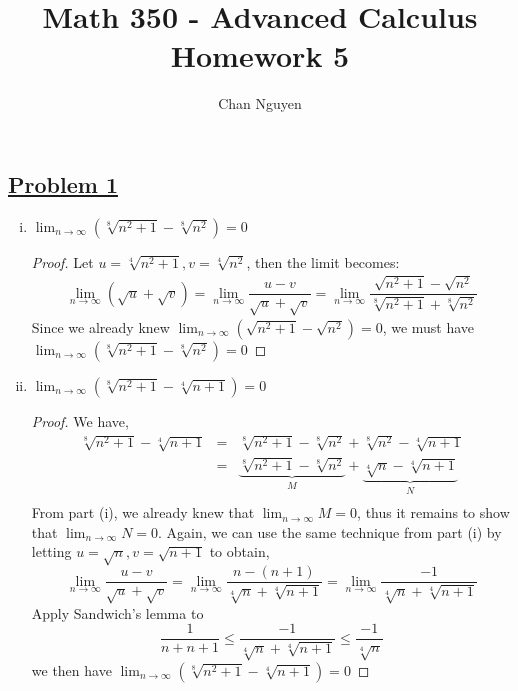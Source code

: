 \documentclass[10pt,letterpaper]{article}
\title{\textbf{Math 350 - Advanced Calculus \\ Homework 5}}
\author{Chan Nguyen}
\begin{document}
\tableofcontents 
\maketitle

\setlength{\parindent}{0pt}
\setlength{\parskip}{1ex}
	\subsection*{{\color{purple}\underline{Problem 1}}}
	\begin{enumerate}[(i)]
		\item $\displaystyle\lim_{n\to\infty}(\sqrt[8]{n^2 + 1} - \sqrt[8]{n^2}) = 0$
		\begin{proof}
		Let $u = \sqrt[4]{n^2 + 1}, v = \sqrt[4]{n^2}$, then the limit becomes:
	 	\begin{eqnarray*}
		\displaystyle\lim_{n\to\infty} (\sqrt{u} + \sqrt{v}) 
		= \displaystyle\lim_{n\to\infty} \dfrac{u - v}{\sqrt{u} + \sqrt{v}} 
		= \displaystyle\lim_{n\to\infty} \dfrac{\sqrt{n^2 + 1} - \sqrt{n^2}}{\sqrt[8]{n^2 + 1} + \sqrt[8]{n^2}} 
		\end{eqnarray*}
		Since we already knew $\displaystyle\lim_{n\to\infty} (\sqrt{n^2 + 1} - \sqrt{n^2}) = 0$, we must have 
		$\displaystyle\lim_{n\to\infty}(\sqrt[8]{n^2 + 1} - \sqrt[8]{n^2}) = 0$
		\end{proof}
		
		\item $\displaystyle\lim_{n\to\infty}(\sqrt[8]{n^2 + 1} - \sqrt[4]{n + 1}) = 0$
		\begin{proof}		
		We have,
		\begin{eqnarray*}
		\sqrt[8]{n^2 + 1} - \sqrt[4]{n + 1} 
		&=& \sqrt[8]{n^2 + 1} - \sqrt[8]{n^2} + \sqrt[8]{n^2} - \sqrt[4]{n + 1} \\
		&=& \underbrace{\sqrt[8]{n^2 + 1} - \sqrt[8]{n^2}}_M + \underbrace{\sqrt[4]{n} - \sqrt[4]{n + 1}}_N \\
		\end{eqnarray*}
		From part (i), we already knew that $\displaystyle\lim_{n\to\infty} M = 0$, thus it remains to show
		that $\displaystyle\lim_{n\to\infty}N = 0$. Again, we can use the same technique from part (i) by 
		letting $u = \sqrt{n}, v = \sqrt{n + 1}$ to obtain,
		$$\displaystyle\lim_{n\to\infty} \dfrac{u - v}{\sqrt{u} + \sqrt{v}} = 
		\displaystyle\lim_{n\to\infty} \dfrac{n - (n + 1)}{\sqrt[4]{n} + \sqrt[4]{n + 1}}
		= \displaystyle\lim_{n\to\infty} \dfrac{-1}{{\sqrt[4]{n} + \sqrt[4]{n + 1}}}
		$$
		Apply Sandwich's lemma to 
		$$\dfrac{1}{n + n + 1} \leq \dfrac{-1}{{\sqrt[4]{n} + \sqrt[4]{n + 1}}} \leq \dfrac{-1}{\sqrt[4]{n}}$$
		we then have $\displaystyle\lim_{n\to\infty}(\sqrt[8]{n^2 + 1} - \sqrt[4]{n + 1}) = 0$
		\end{proof}
	\end{enumerate}
	
\end{document}
